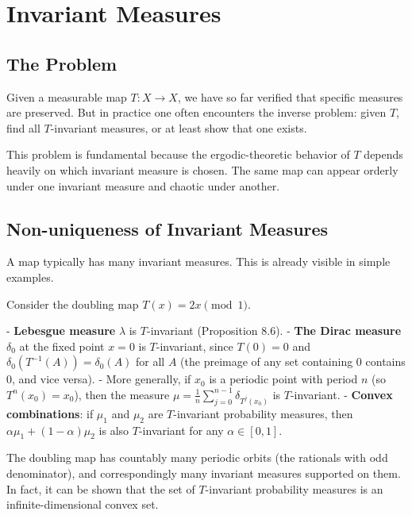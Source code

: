 \section{Invariant Measures}\label{sec:8.3}

\subsection{The Problem}\label{sec:8.3.1}

Given a measurable map $T: X \to X$, we have so far verified that specific measures are preserved. But in practice one often encounters the inverse problem: given $T$, find all $T$-invariant measures, or at least show that one exists.

This problem is fundamental because the ergodic-theoretic behavior of $T$ depends heavily on which invariant measure is chosen. The same map can appear orderly under one invariant measure and chaotic under another.

\subsection{Non-uniqueness of Invariant Measures}\label{sec:8.3.2}

A map typically has many invariant measures. This is already visible in simple examples.

\begin{example}
Consider the doubling map $T(x) = 2x \pmod{1}$.

- \textbf{Lebesgue measure} $\lambda$ is $T$-invariant (Proposition 8.6).
- \textbf{The Dirac measure} $\delta_0$ at the fixed point $x = 0$ is $T$-invariant, since $T(0) = 0$ and $\delta_0(T^{-1}(A)) = \delta_0(A)$ for all $A$ (the preimage of any set containing 0 contains 0, and vice versa).
- More generally, if $x_0$ is a periodic point with period $n$ (so $T^n(x_0) = x_0$), then the measure $\mu = \frac{1}{n}\sum_{j=0}^{n-1} \delta_{T^j(x_0)}$ is $T$-invariant.
- \textbf{Convex combinations}: if $\mu_1$ and $\mu_2$ are $T$-invariant probability measures, then $\alpha \mu_1 + (1-\alpha)\mu_2$ is also $T$-invariant for any $\alpha \in [0,1]$.

The doubling map has countably many periodic orbits (the rationals with odd denominator), and correspondingly many invariant measures supported on them. In fact, it can be shown that the set of $T$-invariant probability measures is an infinite-dimensional convex set.
\end{example}


